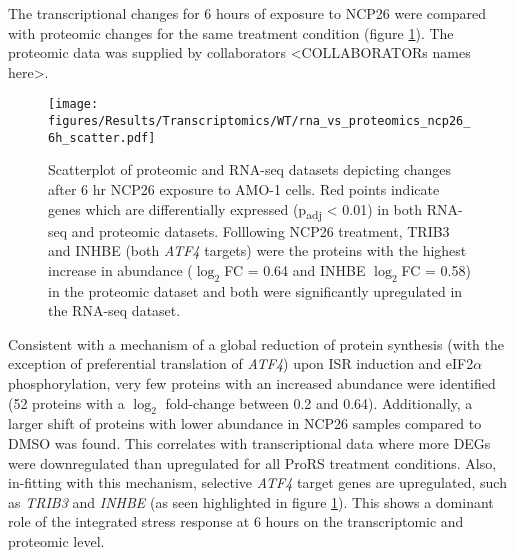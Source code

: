 The transcriptional changes for 6 hours of exposure to NCP26 were compared with proteomic changes for the same treatment condition (figure \ref{fig:proteomic_rna_scatter}).
The proteomic data was supplied by collaborators <COLLABORATORs names here>.
\begin{figure}[htb]
\centering
\texttt{[image: figures/Results/Transcriptomics/WT/rna\_vs\_proteomics\_ncp26\_6h\_scatter.pdf]}
\caption[]{Scatterplot of proteomic and RNA-seq datasets depicting changes after 6 hr NCP26 exposure to AMO-1 cells.
Red points indicate genes which are differentially expressed (p\textsubscript{adj} < 0.01) in both RNA-seq and proteomic datasets.
Folllowing NCP26 treatment, TRIB3 and INHBE (both \textit{ATF4} targets) were the proteins with the highest increase in abundance ($\log_{2}$FC = 0.64 and INHBE  $\log_{2}$FC = 0.58) in the proteomic dataset and both were significantly upregulated in the RNA-seq dataset.
}
\label{fig:proteomic_rna_scatter}
\end{figure}
%
Consistent with a mechanism of a global reduction of protein synthesis (with the exception of preferential translation of \textit{ATF4}) upon  ISR induction and eIF2$\alpha$ phosphorylation, very few proteins with an increased abundance were identified (52 proteins with a $\log_{2}$ fold-change between 0.2 and 0.64).
Additionally, a larger shift of proteins with lower abundance in NCP26 samples compared to DMSO was found.
This correlates with transcriptional data where more DEGs were downregulated than upregulated for all ProRS treatment conditions.
Also, in-fitting with this mechanism, selective \textit{ATF4} target genes are upregulated, such as \textit{TRIB3} and \textit{INHBE} (as seen highlighted in figure \ref{fig:proteomic_rna_scatter}).
This shows a dominant role of the integrated stress response at 6 hours on the transcriptomic and proteomic level.




